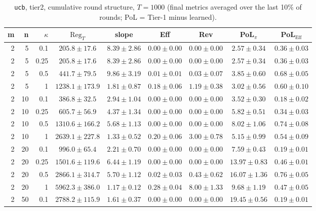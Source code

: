 \begin{table}[htbp]
\centering
\scriptsize
\caption{\texttt{ucb}, tier2, cumulative round structure, $T=1000$ (final metrics averaged over the last 10\% of rounds; PoL = Tier-1 minus learned).}
\label{tab:tier2_ucb_cumulative}
\begin{tabular}{@{}rrrcccccc@{}}
\toprule
m & n & $\kappa$ & $\mathrm{Reg}_T$ & slope & Eff & Rev & PoL$_\pi$ & PoL$_\mathrm{Eff}$ \\
\midrule
2 & 5 & 0.1 & $205.8 \pm 17.6$ & $8.39 \pm 2.86$ & $0.00 \pm 0.00$ & $0.00 \pm 0.00$ & $2.57 \pm 0.34$ & $0.36 \pm 0.03$ \\
2 & 5 & 0.25 & $205.8 \pm 17.6$ & $8.39 \pm 2.86$ & $0.00 \pm 0.00$ & $0.00 \pm 0.00$ & $2.57 \pm 0.34$ & $0.36 \pm 0.03$ \\
2 & 5 & 0.5 & $441.7 \pm 79.5$ & $9.86 \pm 3.19$ & $0.01 \pm 0.01$ & $0.03 \pm 0.07$ & $3.85 \pm 0.60$ & $0.68 \pm 0.05$ \\
2 & 5 & 1 & $1238.1 \pm 173.9$ & $1.81 \pm 0.87$ & $0.18 \pm 0.06$ & $1.19 \pm 0.38$ & $3.02 \pm 0.56$ & $0.60 \pm 0.10$ \\
2 & 10 & 0.1 & $386.8 \pm 32.5$ & $2.94 \pm 1.04$ & $0.00 \pm 0.00$ & $0.00 \pm 0.00$ & $3.52 \pm 0.30$ & $0.18 \pm 0.02$ \\
2 & 10 & 0.25 & $605.7 \pm 56.9$ & $4.37 \pm 1.34$ & $0.00 \pm 0.00$ & $0.00 \pm 0.00$ & $5.82 \pm 0.51$ & $0.34 \pm 0.03$ \\
2 & 10 & 0.5 & $1310.6 \pm 166.2$ & $5.68 \pm 1.13$ & $0.00 \pm 0.00$ & $0.00 \pm 0.00$ & $8.02 \pm 1.06$ & $0.74 \pm 0.08$ \\
2 & 10 & 1 & $2639.1 \pm 227.8$ & $1.33 \pm 0.52$ & $0.20 \pm 0.06$ & $3.00 \pm 0.78$ & $5.15 \pm 0.99$ & $0.54 \pm 0.09$ \\
2 & 20 & 0.1 & $996.0 \pm 65.4$ & $2.21 \pm 0.70$ & $0.00 \pm 0.00$ & $0.00 \pm 0.00$ & $7.59 \pm 0.43$ & $0.19 \pm 0.01$ \\
2 & 20 & 0.25 & $1501.6 \pm 119.6$ & $6.44 \pm 1.19$ & $0.00 \pm 0.00$ & $0.00 \pm 0.00$ & $13.97 \pm 0.83$ & $0.46 \pm 0.01$ \\
2 & 20 & 0.5 & $2866.1 \pm 314.7$ & $5.70 \pm 1.12$ & $0.02 \pm 0.03$ & $0.43 \pm 0.62$ & $16.07 \pm 1.36$ & $0.76 \pm 0.05$ \\
2 & 20 & 1 & $5962.3 \pm 386.0$ & $1.17 \pm 0.12$ & $0.28 \pm 0.04$ & $8.00 \pm 1.33$ & $9.68 \pm 1.19$ & $0.47 \pm 0.05$ \\
2 & 50 & 0.1 & $2788.2 \pm 115.9$ & $1.61 \pm 0.37$ & $0.00 \pm 0.00$ & $0.00 \pm 0.00$ & $19.45 \pm 0.56$ & $0.19 \pm 0.01$ \\

\end{tabular}
\end{table}
